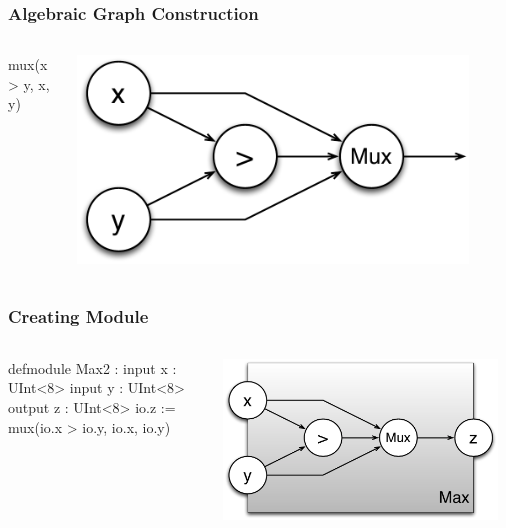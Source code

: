 \documentclass[xcolor=pdflatex,dvipsnames,table]{beamer}
\begin{document}
\begin{frame}[fragile]
\frametitle{Algebraic Graph Construction}

\begin{columns}
{
\begin{stanza}
mux(x > y, x, y)
\end{stanza}
}


\begin{center}
\includegraphics[width=0.9\textwidth]{figs/max2.pdf} 
\end{center}
\end{columns}
\end{frame}

\begin{frame}[fragile]
\frametitle{Creating Module}

\begin{columns}

{
\begin{stanza}
defmodule Max2 :
  input x : UInt<8>
  input y : UInt<8>
  output z : UInt<8>
  io.z := mux(io.x > io.y, io.x, io.y)
\end{stanza}
}

\begin{center}
\includegraphics[width=0.95\textwidth]{figs/Max2c.pdf} \\
\end{center}
\end{columns}

\end{frame}
\end{document}
